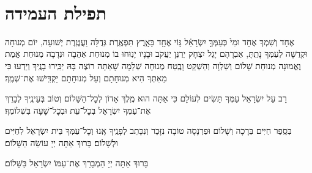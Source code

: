 \documentclass[twoside, openany, parskip=half, 11pt]{book}
\begin{document}

\hagbaha

\yehalelu

\\
\kafdalet

\nextpage
\etzchaim

\label{shabYTamidah}
\halfkaddish

\section[תפילת העמידה]{ תפילת העמידה }


\amidaopening{\shabbosshuva}{}

\weekdaysakedusha

\sepline


אֶחָד וְשִׁמְךָ אֶחָד וּמִי֙ כְּעַמְּךָ֣ יִשְׂרָאֵ֔ל גּ֥וֹי אֶחָ֖ד בָּאָ֑רֶץ תִּפְאֶֽרֶת גְּדֻלָּה וַעֲטֶֽרֶת יְשׁוּעָה, יוֹם מְנוּחָה וּקְדֻשָּׁה לְעַמְּךָ נָתַֽתָּ, אַבְרָהָם יָגֵל יִצְחָק יְרַנֵּן יַעֲקֹב וּבָנָיו יָנֽוּחוּ בוֹ מְנוּחַת אַהֲבָה וּנְדָבָה מְנוּחַת אֱמֶת וֶאֱמוּנָה מְנוּחַת שָׁלוֹם וְשַׁלְוָה וְהַשְׁקֵט וָבֶֽטַח מְנוּחָה שְׁלֵמָה שָׁאַתָּה רוֹצֶה בָּהּ יַכִּֽירוּ בָנֶֽיךָ וְיֵדְעוּ כִּי מֵאִתְּךָ הִיא מְנוּחָתָם וְעַל מְנוּחָתָם יַקְדִּֽישׁוּ אֶת־שְׁמֶֽךָ׃

\shabboskiddushhayom{} 


\sepline

\label{ytmincha}
\ytkiddushhayom{}

\sepline

\retzeh

\yaalehveyavo

\zion

\modim

\shabboschanukah

\shabboshodos

רָב עַל יִשְׂרָאֵל עַמְּךָ תָּשִׂים לְעוֹלָם כִּי אַתָּה הוּא מֶֽלֶךְ אָדוֹן לְכׇל־הַשָּׁלוֹם׃ וְטוֹב בְּעֵינֶֽיךָ לְבָרֵךְ אֶת־עַמְּךָ יִשְׂרָאֵל בְּכׇל־עֵת וּבְכׇל־שָׁעָה בִּשְׁלוֹמֶךָ׃
\vspace{-0.4\baselineskip}
\begin{paracol}{2}

\begin{small}
בְּסֵֽפֶר חַיִּים בְּרָכָה וְשָׁלוֹם וּפַרְנָסָה טוֹבָה נִזָּכֵר וְנִכָּתֵב לְפָנֶֽיךָ אָֽנוּ וְכׇל־עַמְּךָ בֵּית יִשְׂרָאֵל לְחַיִּים וּלְשָׁלוֹם׃ בָּרוּךְ אַתָּה יְיָ עוֹשֵׂה הַשָּׁלוֹם׃

\end{small}
\switchcolumn
בָּרוּךְ אַתָּה יְיָ הַמְבָרֵךְ אֶת־עַמּוֹ יִשְׂרָאֵל בַּשָּׁלוֹם׃

\end{paracol}
\end{document}
